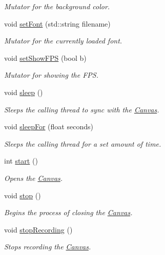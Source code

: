 \begin{DoxyCompactItemize}
\begin{DoxyCompactList}\small\item\em Mutator for the background color. \end{DoxyCompactList}\item 
void \hyperlink{classtsgl_1_1_canvas_a692edf8e37c7714cdf2a58ea530c63e9}{set\-Font} (std\-::string filename)
\begin{DoxyCompactList}\small\item\em Mutator for the currently loaded font. \end{DoxyCompactList}\item 
void \hyperlink{classtsgl_1_1_canvas_a8722c579dfa55a45e139bfeb269d73ff}{set\-Show\-F\-P\-S} (bool b)
\begin{DoxyCompactList}\small\item\em Mutator for showing the F\-P\-S. \end{DoxyCompactList}\item 
void \hyperlink{classtsgl_1_1_canvas_a2604fa056d4541f918ccf447eda1f3cf}{sleep} ()
\begin{DoxyCompactList}\small\item\em Sleeps the calling thread to sync with the \hyperlink{classtsgl_1_1_canvas}{Canvas}. \end{DoxyCompactList}\item 
void \hyperlink{classtsgl_1_1_canvas_a6674cc86b9a54b6a564021fddce47e36}{sleep\-For} (float seconds)
\begin{DoxyCompactList}\small\item\em Sleeps the calling thread for a set amount of time. \end{DoxyCompactList}\item 
int \hyperlink{classtsgl_1_1_canvas_a654315f9b08a9b3b072eebf4b4d8ae89}{start} ()
\begin{DoxyCompactList}\small\item\em Opens the \hyperlink{classtsgl_1_1_canvas}{Canvas}. \end{DoxyCompactList}\item 
void \hyperlink{classtsgl_1_1_canvas_a46cd37a9f2a146e57b4e0273faf6485c}{stop} ()
\begin{DoxyCompactList}\small\item\em Begins the process of closing the \hyperlink{classtsgl_1_1_canvas}{Canvas}. \end{DoxyCompactList}\item 
void \hyperlink{classtsgl_1_1_canvas_ac6035d87aa3bf077031bc0bb6f419b17}{stop\-Recording} ()
\begin{DoxyCompactList}\small\item\em Stops recording the \hyperlink{classtsgl_1_1_canvas}{Canvas}. \end{DoxyCompactList}\item 

\end{DoxyCompactItemize}
